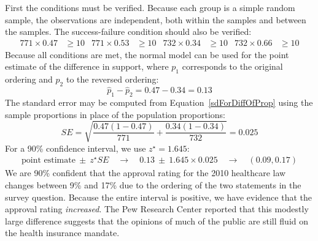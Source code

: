 \begin{example}
First the conditions must be verified. Because each group is a simple random sample, the observations are independent, both within the samples and between the samples. The success-failure condition should also be verified:
\begin{align*}
771 \times 0.47 &\ge 10
	&771 \times 0.53 &\ge 10
	&732 \times 0.34 &\ge 10
	&732 \times 0.66 &\ge 10
\end{align*}
Because all conditions are met, the normal model can be used for the point estimate of the difference in support, where $p_1$ corresponds to the original ordering and $p_2$ to the reversed ordering:
$$\hat{p}_{1} - \hat{p}_{2} = 0.47 - 0.34 = 0.13$$
The standard error may be computed from Equation~\eqref{sdForDiffOfProp} using the sample proportions in place of the population proportions:
$$SE = \sqrt{\frac{0.47(1-0.47)}{771} + \frac{0.34(1-0.34)}{732}} = 0.025$$
For a 90\% confidence interval, we use $z^{\star} = 1.645$:
\begin{align*}
\text{point estimate} \ \pm\ z^{\star}SE
\quad\rightarrow\quad
0.13 \ \pm\ 1.645 \times  0.025
\quad\rightarrow\quad
(0.09, 0.17)
\end{align*}
We are 90\% confident that the approval rating for the 2010 healthcare law changes between 9\% and 17\% due to the ordering of the two statements in the survey question. Because the entire interval is positive, we have evidence that the approval rating \emph{increased}. The Pew Research Center reported that this modestly large difference suggests that the opinions of much of the public are still fluid on the health insurance mandate.
\end{example}

